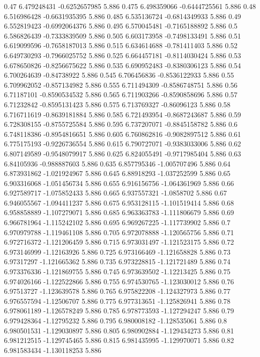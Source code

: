 {0.47 6.479248431 -0.6252657985 5.886
0.475 6.498359066 -0.6444725561 5.886
0.48 6.516986428 -0.6631935395 5.886
0.485 6.535136724 -0.6814349933 5.886
0.49 6.552819423 -0.6992064376 5.886
0.495 6.570045481 -0.7165188892 5.886
0.5 6.586826439 -0.7333839509 5.886
0.505 6.603173958 -0.7498133491 5.886
0.51 6.619099596 -0.7658187013 5.886
0.515 6.634614688 -0.781411403 5.886
0.52 6.649730293 -0.7966025752 5.886
0.525 6.664457181 -0.8114030424 5.886
0.53 6.678650826 -0.8256675622 5.886
0.535 6.690952483 -0.8380306123 5.886
0.54 6.700264639 -0.84738922 5.886
0.545 6.706456836 -0.8536122933 5.886
0.55 6.709962052 -0.857134982 5.886
0.555 6.711494309 -0.8586748751 5.886
0.56 6.71187101 -0.8590534532 5.886
0.565 6.711903266 -0.8590858696 5.886
0.57 6.71232842 -0.8595131423 5.886
0.575 6.713769327 -0.86096123 5.886
0.58 6.716711619 -0.8639181884 5.886
0.585 6.721493954 -0.8687243687 5.886
0.59 6.728308155 -0.8755725584 5.886
0.595 6.737207071 -0.8845158782 5.886
0.6 6.748118386 -0.8954816651 5.886
0.605 6.760862816 -0.9082897512 5.886
0.61 6.775175193 -0.9226736554 5.886
0.615 6.790727071 -0.9383033006 5.886
0.62 6.807149589 -0.9548079917 5.886
0.625 6.824055491 -0.9717985404 5.886
0.63 6.84105936 -0.988887603 5.886
0.635 6.857795346 -1.005707496 5.886
0.64 6.873931862 -1.021924967 5.886
0.645 6.88918293 -1.037252599 5.886
0.65 6.903316068 -1.051456734 5.886
0.655 6.916156756 -1.064361969 5.886
0.66 6.927589717 -1.075852433 5.886
0.665 6.937557321 -1.0858702 5.886
0.67 6.946055567 -1.094411237 5.886
0.675 6.953128115 -1.101519414 5.886
0.68 6.958858889 -1.107279071 5.886
0.685 6.963363783 -1.111806679 5.886
0.69 6.966781964 -1.115242102 5.886
0.695 6.969267225 -1.117739902 5.886
0.7 6.970979788 -1.119461108 5.886
0.705 6.972078888 -1.120565756 5.886
0.71 6.972716372 -1.121206459 5.886
0.715 6.973031497 -1.121523175 5.886
0.72 6.973146999 -1.12163926 5.886
0.725 6.973166469 -1.121658828 5.886
0.73 6.97317297 -1.121665362 5.886
0.735 6.973228815 -1.121721489 5.886
0.74 6.973376336 -1.121869755 5.886
0.745 6.973639502 -1.12213425 5.886
0.75 6.974026166 -1.122522866 5.886
0.755 6.974530765 -1.123030012 5.886
0.76 6.97513727 -1.123639578 5.886
0.765 6.975822208 -1.124327973 5.886
0.77 6.976557594 -1.12506707 5.886
0.775 6.977313651 -1.125826941 5.886
0.78 6.978061189 -1.126578249 5.886
0.785 6.978773593 -1.127294247 5.886
0.79 6.979428364 -1.12795232 5.886
0.795 6.980008182 -1.128535061 5.886
0.8 6.980501531 -1.129030897 5.886
0.805 6.980902884 -1.129434273 5.886
0.81 6.981212515 -1.129745465 5.886
0.815 6.981435995 -1.129970071 5.886
0.82 6.981583434 -1.130118253 5.886
}
